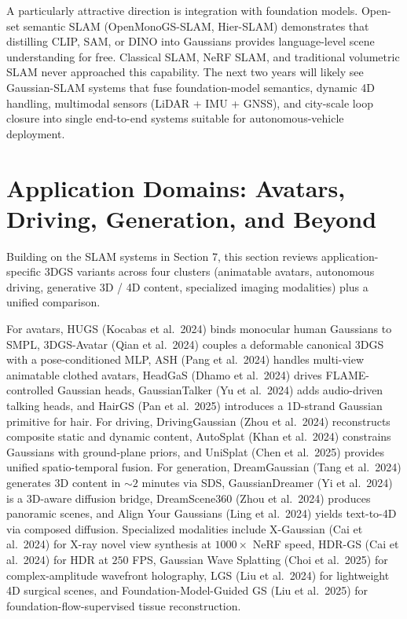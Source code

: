 A particularly attractive direction is integration with foundation models. Open-set semantic SLAM (OpenMonoGS-SLAM, Hier-SLAM) demonstrates that distilling CLIP, SAM, or DINO into Gaussians provides language-level scene understanding for free. Classical SLAM, NeRF SLAM, and traditional volumetric SLAM never approached this capability. The next two years will likely see Gaussian-SLAM systems that fuse foundation-model semantics, dynamic 4D handling, multimodal sensors (LiDAR + IMU + GNSS), and city-scale loop closure into single end-to-end systems suitable for autonomous-vehicle deployment.

\section{Application Domains: Avatars, Driving, Generation, and Beyond}\label{application-domains-avatars-driving-generation-and-beyond}

Building on the SLAM systems in Section 7, this section reviews application-specific 3DGS variants across four clusters (animatable avatars, autonomous driving, generative 3D / 4D content, specialized imaging modalities) plus a unified comparison.

For avatars, HUGS (Kocabas et al.~2024) binds monocular human Gaussians to SMPL, 3DGS-Avatar (Qian et al.~2024) couples a deformable canonical 3DGS with a pose-conditioned MLP, ASH (Pang et al.~2024) handles multi-view animatable clothed avatars, HeadGaS (Dhamo et al.~2024) drives FLAME-controlled Gaussian heads, GaussianTalker (Yu et al.~2024) adds audio-driven talking heads, and HairGS (Pan et al.~2025) introduces a 1D-strand Gaussian primitive for hair. For driving, DrivingGaussian (Zhou et al.~2024) reconstructs composite static and dynamic content, AutoSplat (Khan et al.~2024) constrains Gaussians with ground-plane priors, and UniSplat (Chen et al.~2025) provides unified spatio-temporal fusion. For generation, DreamGaussian (Tang et al.~2024) generates 3D content in \(\sim 2\) minutes via SDS, GaussianDreamer (Yi et al.~2024) is a 3D-aware diffusion bridge, DreamScene360 (Zhou et al.~2024) produces panoramic scenes, and Align Your Gaussians (Ling et al.~2024) yields text-to-4D via composed diffusion. Specialized modalities include X-Gaussian (Cai et al.~2024) for X-ray novel view synthesis at \(1000{\times}\) NeRF speed, HDR-GS (Cai et al.~2024) for HDR at \(250\) FPS, Gaussian Wave Splatting (Choi et al.~2025) for complex-amplitude wavefront holography, LGS (Liu et al.~2024) for lightweight 4D surgical scenes, and Foundation-Model-Guided GS (Liu et al.~2025) for foundation-flow-supervised tissue reconstruction.


